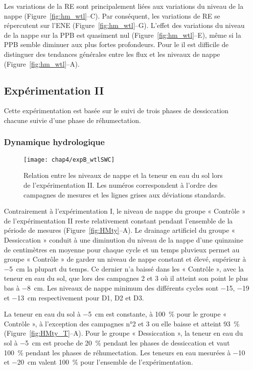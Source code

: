 Les variations de la RE sont principalement liées aux variations du niveau de la nappe (Figure~\ref{fig:hm_wtl}--C).
Par conséquent, les variations de RE se répercutent sur l'ENE (Figure~\ref{fig:hm_wtl}--G).
L'effet des variations du niveau de la nappe sur la PPB est quasiment nul (Figure~\ref{fig:hm_wtl}--E), même si la PPB semble diminuer aux plus fortes profondeurs.
Pour le \chh il est difficile de distinguer des tendances générales entre les flux et les niveaux de nappe (Figure~\ref{fig:hm_wtl}--A).

\subsection{Expérimentation II}

Cette expérimentation est basée sur le suivi de trois phases de dessiccation chacune suivie d'une phase de réhumectation.

\subsubsection{Dynamique hydrologique}

\begin{figure}
\centering
\texttt{[image: chap4/expB\_wtlSWC]}
\caption{Relation entre les niveaux de nappe et la teneur en eau du sol lors de l'expérimentation II. Les numéros correspondent à l'ordre des campagnes de mesures et les lignes grises aux déviations standards.}
\label{fig:wtlSWC_B}
\end{figure}

Contrairement à l'expérimentation I, le niveau de nappe du groupe « Contrôle » de l'expérimentation II reste relativement constant pendant l'ensemble de la période de mesures (Figure~\ref{fig:HMty}--A).
Le drainage artificiel du groupe « Dessiccation » conduit à une diminution du niveau de la nappe d'une quinzaine de centimètres en moyenne pour chaque cycle et un temps pluvieux permet au groupe « Contrôle » de garder un niveau de nappe constant et élevé, supérieur à \SI{-5}{\centi\metre} la plupart du temps.
Ce dernier n'a baissé dans les « Contrôle », avec la teneur en eau du sol, que lors des campagnes 2 et 3 où il atteint son point le plus bas à \SI{-8}{\centi\metre}.
Les niveaux de nappe minimum des différents cycles sont \num{-15}, \num{-19} et \SI{-13}{\centi\metre} respectivement pour D1, D2 et D3.

La teneur en eau du sol à \SI{-5}{\centi\metre} est constante, à \SI{100}{\percent} pour le groupe « Contrôle », à l'exception des campagnes n°2 et 3 ou elle baisse et atteint \SI{93}{\percent} (Figure~\ref{fig:HMty_T}--A).
Pour le groupe « Dessiccation », la teneur en eau du sol à \SI{-5}{\centi\metre} est proche de \SI{20}{\percent} pendant les phases de dessiccation et vaut \SI{100}{\percent} pendant les phases de réhumectation.
Les teneurs en eau mesurées à \num{-10} et \SI{-20}{\centi\metre} valent \SI{100}{\percent} pour l'ensemble de l'expérimentation.

